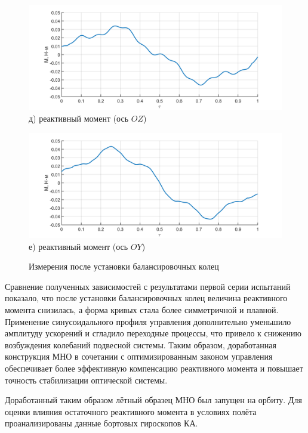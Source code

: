\begin{figure}[h!]
	\begin{minipage}[b]{0.49\linewidth}\centering
		\includegraphics[width=\linewidth]{matlab/img/oz-gyro-sin-mom} \\ д) реактивный момент (ось $OZ$)
	\end{minipage}
	\hfill
	\begin{minipage}[b]{0.49\linewidth}\centering
		\includegraphics[width=\linewidth]{matlab/img/oy-gyro-sin-mom} \\ е)  реактивный момент (ось $OY$)
	\end{minipage}
	
	\caption{Измерения после установки балансировочных колец}
	\label{fig:sin-profile-omn}
\end{figure}

Сравнение полученных зависимостей с результатами первой серии испытаний показало, что после установки балансировочных колец величина реактивного момента снизилась, а форма кривых стала более симметричной и плавной. Применение синусоидального профиля управления дополнительно уменьшило амплитуду ускорений и сгладило переходные процессы, что привело к снижению возбуждения колебаний подвесной системы. Таким образом, доработанная конструкция МНО в сочетании с оптимизированным законом управления обеспечивает более эффективную компенсацию реактивного момента и повышает точность стабилизации оптической системы.

Доработанный таким образом лётный образец МНО был запущен на орбиту. Для оценки влияния остаточного реактивного момента в условиях полёта
проанализированы данные бортовых гироскопов КА.

